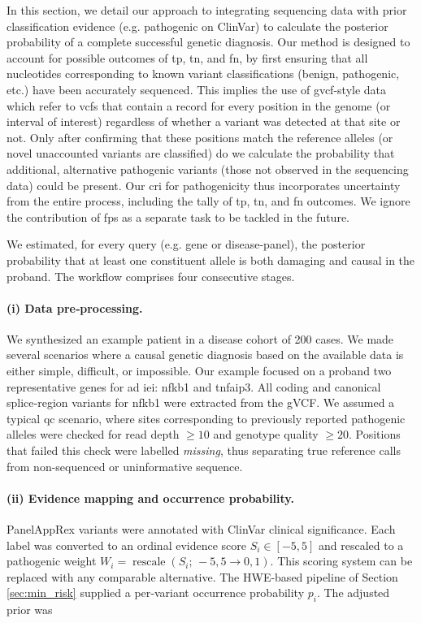 In this section, we detail our approach to integrating sequencing data with prior classification evidence (e.g. pathogenic on ClinVar) to calculate the posterior probability of a complete successful genetic diagnosis.
Our method is designed to account for possible outcomes of 
\ac{tp},
\ac{tn},
and \ac{fn},
by first ensuring that all nucleotides corresponding to known variant classifications (benign, pathogenic, etc.) have been accurately sequenced. 
This implies the use of \ac{gvcf}-style data which refer to \ac{vcf}s that contain a record for every position in the genome (or interval of interest) regardless of whether a variant was detected at that site or not.
Only after confirming that these positions match the reference alleles (or novel unaccounted variants are classified) do we calculate the probability that additional, alternative pathogenic variants (those not observed in the sequencing data) could be present. 
Our \ac{cri} for pathogenicity thus incorporates uncertainty from the entire process, including the tally of \ac{tp}, \ac{tn}, and \ac{fn} outcomes.
We ignore the contribution of \ac{fp}s  as a separate task to be tackled in the future.

We estimated, for every query (e.g. gene or disease-panel), the posterior probability that at least one constituent allele is both damaging and causal in the proband.  
The workflow comprises four consecutive stages.

\paragraph{(i) Data pre‑processing.}
We synthesized an example patient in a disease cohort of 200 cases.
We made several scenarios where a causal genetic diagnosis based on the available data is either simple, difficult, or impossible.
Our example focused on a proband two representative genes for \ac{ad} \ac{iei}: \ac{nfkb1} and  \ac{tnfaip3}.
All coding and canonical splice‑region variants for \ac{nfkb1} were extracted from the gVCF.  
We assumed a typical \ac{qc} scenario, where sites corresponding to previously reported pathogenic alleles were checked for read depth \mbox{$\ge\!10$} and genotype quality \mbox{$\ge\!20$}.  
Positions that failed this check were labelled \emph{missing}, thus separating true reference calls from non-sequenced or uninformative sequence.

\paragraph{(ii) Evidence mapping and occurrence probability.}
PanelAppRex variants were annotated with ClinVar clinical significance.  Each label was converted to an ordinal evidence score $S_i\in[-5,5]$ and rescaled to a pathogenic weight $W_i=\operatorname{rescale}(S_i;\,-5,5\rightarrow0,1)$.  
This scoring system can be replaced with any comparable alternative.
The HWE-based pipeline of Section \ref{sec:min_risk} supplied a per‑variant occurrence probability $p_i$.  The adjusted prior was

